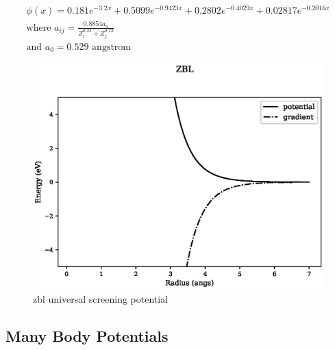 \begin{equation}
\begin{split}
\phi(x) = 0.181 e^{-3.2x} + 0.5099 e^{-0.9423x} + 0.2802 e^{-0.4029x} + 0.02817 e^{-0.2016x} \\
\text{where } a_{ij} = \frac{0.8854 a_0}{Z^{0.23}_i + Z^{0.23}_j} \\
\text{and } a_0 = 0.529 \text{ angstrom}
\end{split}
\label{eq:screeningPotential}
\end{equation}


\begin{figure}[!htbp]
  \begin{center}
    \includegraphics[width=.6\linewidth]{chapters/interatomic_potential_fitting/plots_pair_potentials/zbl.eps}
    \caption{\acrshort{zbl} universal screening potential}
    \label{fig:zbluniversalscreening}
  \end{center}
\end{figure}


\FloatBarrier




\subsection{Many Body Potentials}


